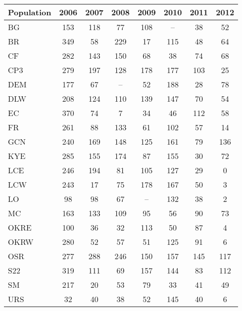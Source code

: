 \documentclass[varwidth=\maxdimen,border=1pt]{standalone}
\begin{document}
  
\begin{tabular}{lccccccc}
  \hline
Population & 2006 & 2007 & 2008 & 2009 & 2010 & 2011 & 2012 \\ 
  \hline
BG & 153 & 118 &  77 & 108 & -- &  38 &  52 \\ 
  BR & 349 &  58 & 229 &  17 & 115 &  48 &  64 \\ 
  CF & 282 & 143 & 150 &  68 &  38 &  74 &  68 \\ 
  CP3 & 279 & 197 & 128 & 178 & 177 & 103 &  25 \\ 
  DEM & 177 &  67 & -- &  52 & 188 &  28 &  78 \\ 
  DLW & 208 & 124 & 110 & 139 & 147 &  70 &  54 \\ 
  EC & 370 &  74 &   7 &  34 &  46 & 112 &  58 \\ 
  FR & 261 &  88 & 133 &  61 & 102 &  57 &  14 \\ 
  GCN & 240 & 169 & 148 & 125 & 161 &  79 & 136 \\ 
  KYE & 285 & 155 & 174 &  87 & 155 &  30 &  72 \\ 
  LCE & 246 & 194 &  81 & 105 & 127 &  29 &   0 \\ 
  LCW & 243 &  17 &  75 & 178 & 167 &  50 &   3 \\ 
  LO &  98 &  98 &  67 & -- & 132 &  38 &   2 \\ 
  MC & 163 & 133 & 109 &  95 &  56 &  90 &  73 \\ 
  OKRE & 100 &  36 &  32 & 113 &  50 &  87 &   4 \\ 
  OKRW & 280 &  52 &  57 &  51 & 125 &  91 &   6 \\ 
  OSR & 277 & 288 & 246 & 150 & 157 & 145 & 117 \\ 
  S22 & 319 & 111 &  69 & 157 & 144 &  83 & 112 \\ 
  SM & 217 &  20 &  53 &  79 &  33 &  41 &  49 \\ 
  URS &  32 &  40 &  38 &  52 & 145 &  40 &   6 \\ 
   \hline
\end{tabular}

 
\end{document}
